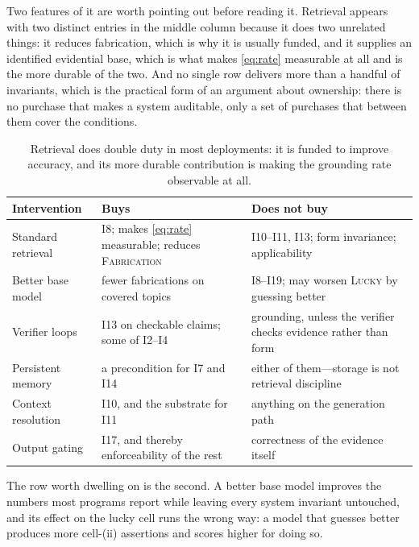Two features of it are worth pointing out before reading it. Retrieval appears with two
distinct entries in the middle column because it does two unrelated things: it reduces
fabrication, which is why it is usually funded, and it supplies an identified evidential
base, which is what makes \eqref{eq:rate} measurable at all and is the more durable of
the two. And no single row delivers more than a handful of invariants, which is the
practical form of an argument about ownership: there is no purchase
that makes a system auditable, only a set of purchases that between them cover the
conditions.

\begin{table}[ht]
  \centering
  \small
  \begin{tabular}{@{}>{\raggedright\arraybackslash}p{3.3cm}>{\raggedright\arraybackslash}p{4.6cm}>{\raggedright\arraybackslash}p{5.4cm}@{}}
    \toprule
    Intervention & Buys & Does not buy \\
    \midrule
    Standard retrieval
      & I8; makes \eqref{eq:rate} measurable; reduces \textsc{Fabrication}
      & I10--I11, I13; form invariance; applicability \\
    \addlinespace
    Better base model
      & fewer fabrications on covered topics
      & I8--I19; may worsen \textsc{Lucky} by guessing better \\
    \addlinespace
    Verifier loops
      & I13 on checkable claims; some of I2--I4
      & grounding, unless the verifier checks evidence rather than form \\
    \addlinespace
    Persistent memory
      & a precondition for I7 and I14
      & either of them---storage is not retrieval discipline \\
    \addlinespace
    Context resolution
      & I10, and the substrate for I11
      & anything on the generation path \\
    \addlinespace
    Output gating
      & I17, and thereby enforceability of the rest
      & correctness of the evidence itself \\
    \bottomrule
  \end{tabular}
  \caption{Retrieval does double duty in most deployments: it is funded to improve
    accuracy, and its more durable contribution is making the grounding rate
    observable at all.}
  \label{tab:interventions}
\end{table}

The row worth dwelling on is the second. A better base model improves the numbers
most programs report while leaving every system invariant untouched, and its
effect on the lucky cell runs the wrong way: a model that guesses better produces
more cell-(ii) assertions and scores higher for doing so.

